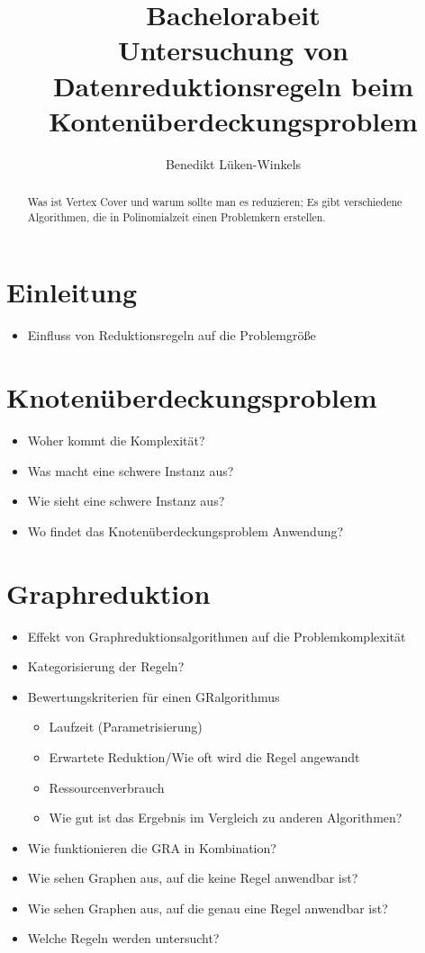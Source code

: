 \documentclass[a4paper]{article}
\begin{document}
\title{Bachelorabeit\\ Untersuchung von Datenreduktionsregeln beim  Kontenüberdeckungsproblem}
\author{Benedikt Lüken-Winkels}
\maketitle
\tableofcontents
\newpage
\begin{abstract}
Was ist Vertex Cover und warum sollte man es reduzieren; Es gibt verschiedene Algorithmen, die in Polinomialzeit einen Problemkern erstellen.
\end{abstract}
\section{Einleitung}
\begin{itemize}
\item Einfluss von Reduktionsregeln auf die Problemgröße
\end{itemize}


\section{Knotenüberdeckungsproblem}
\begin{itemize}
\item Woher kommt die Komplexität?
\item Was macht eine schwere Instanz aus?
\item Wie sieht eine schwere Instanz aus?
\item Wo findet das Knotenüberdeckungsproblem Anwendung?
\end{itemize}

\section{Graphreduktion}

\begin{itemize}
\item Effekt von Graphreduktionsalgorithmen auf die Problemkomplexität
\item Kategorisierung der Regeln?
\item Bewertungskriterien für einen GRalgorithmus
	\begin{itemize}
	\item Laufzeit (Parametrisierung)
	\item Erwartete Reduktion/Wie oft wird die Regel angewandt
	\item Ressourcenverbrauch
	\item Wie gut ist das Ergebnis im Vergleich zu anderen Algorithmen?	
	\end{itemize}
\item Wie funktionieren die GRA in Kombination?
\item Wie sehen Graphen aus, auf die keine Regel anwendbar ist?
\item Wie sehen Graphen aus, auf die genau eine Regel anwendbar ist?
\item Welche Regeln werden untersucht?
\end{itemize}
\end{document}
